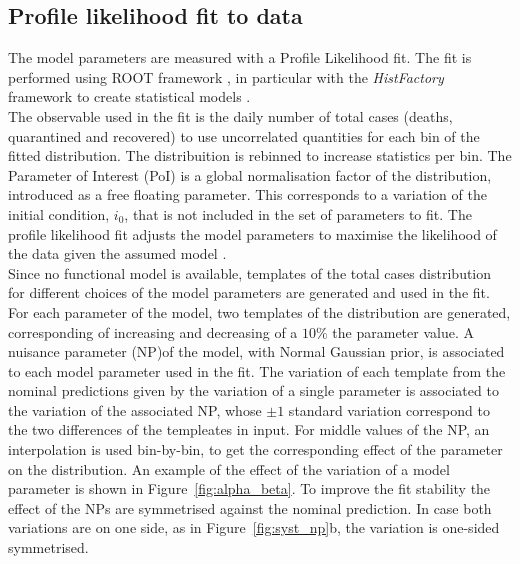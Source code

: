 \subsection{Profile likelihood fit to data}
\label{ssec:plf}

The model parameters are measured with a Profile Likelihood fit. The fit is performed using \textsc{ROOT} framework \cite{ROOT}, in particular with the \emph{HistFactory} framework to create statistical models \cite{HistFactory}.\\

The observable used in the fit is the daily number of total cases (deaths, quarantined and recovered) to use uncorrelated quantities for each bin of the fitted distribution. The distribuition is rebinned to increase statistics per bin. The Parameter of Interest (PoI) is a global normalisation factor of the distribution, introduced as a free floating parameter. This corresponds to a variation of the initial condition, $i_0$, that is not included in the set of parameters to fit. The profile likelihood fit adjusts the model parameters to maximise the likelihood of the data given the assumed model \cite{HistFactory}.\\
  
Since no functional model is available, templates of the total cases distribution for different choices of the model parameters are generated and used in the fit. For each parameter of the model, two templates of the distribution are generated, corresponding of increasing and decreasing of a $10\%$ the parameter value. A nuisance parameter (NP)of the model, with Normal Gaussian prior, is associated to each model parameter used in the fit. The variation of each template from the nominal predictions given by the variation of a single parameter is associated to the variation of the associated NP, whose $\pm1$ standard variation correspond to the two differences of the templeates in input. For middle values of the NP, an interpolation is used bin-by-bin, to get the corresponding effect of the parameter on the distribution. An example of the effect of the variation of a model parameter is shown in Figure~\ref{fig:alpha_beta}. To improve the fit stability the effect of the NPs are symmetrised against the nominal prediction. In case both variations are on one side, as in Figure~\ref{fig:syst_np}b, the variation is one-sided symmetrised.\\

